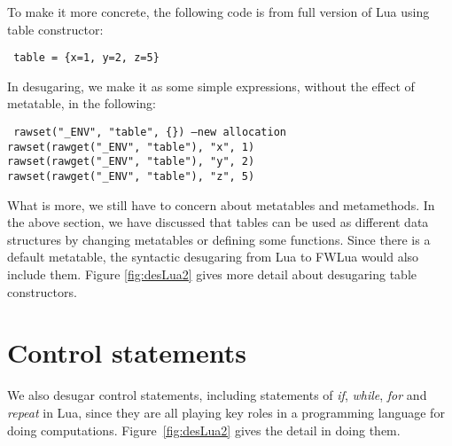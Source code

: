To make it more concrete, the following code is from full version of Lua using table constructor:
\begin{flushleft}
{\tt
table = \{x=1, y=2, z=5\}\\
}
\end{flushleft}
In desugaring, we make it as some simple expressions, without the effect of metatable, in the following:
\begin{flushleft}
{\tt
rawset("\_ENV", "table", \{\}) ---new allocation\\
rawset(rawget("\_ENV", "table"), "x", 1)\\
rawset(rawget("\_ENV", "table"), "y", 2)\\
rawset(rawget("\_ENV", "table"), "z", 5)\\
}
\end{flushleft}

What is more, we still have to concern about metatables and metamethods. In the above section, we have discussed that tables can be used as different data structures by changing metatables or defining some functions. Since there is a default metatable, the syntactic desugaring from Lua to FWLua would also include them. Figure \ref{fig:desLua2} gives more detail about desugaring table constructors.

\section{Control statements}
We also desugar control statements, including statements of {\it if}, {\it while}, {\it for} and {\it repeat} in Lua, since they are all playing key roles in a programming language for doing computations. Figure~\ref{fig:desLua2} gives the detail in doing them.

